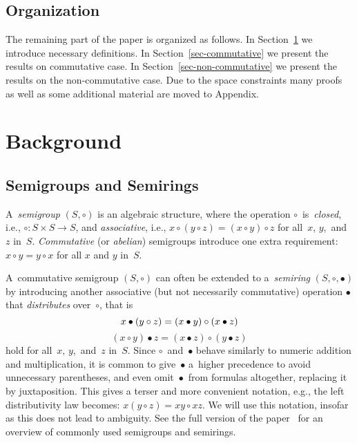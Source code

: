 \documentclass[a4paper,UKenglish,cleveref, autoref]{lipics-v2019}
\begin{document}
\subsection{Organization}

The remaining part of the paper is organized as follows. In Section~\ref{sec:background} we introduce necessary definitions. In Section~\ref{sec-commutative} we present the results on commutative case. In Section~\ref{sec-non-commutative} we present the results on the non-commutative case. Due to the space constraints many proofs as well as some additional material are moved to Appendix.

\section{Background} \label{sec:background}
\subsection{Semigroups and Semirings}
A~\emph{semigroup} $(S, \circ)$ is an algebraic structure, where
the operation
$\circ$~is~\emph{closed}, i.e., $\circ : S\times S \rightarrow S$,
and
\emph{associative}, i.e.,
$x \circ (y \circ z) = (x \circ y) \circ z$ for all~$x$, $y$,~and~$z$
in~$S$.
\emph{Commutative} (or \emph{abelian}) semigroups introduce
one extra requirement: $x \circ y = y \circ x$ for all $x$ and $y$
in~$S$.

A~commutative semigroup $(S, \circ)$ can often be extended to
a~\emph{semiring} $(S, \circ, \bullet)$ by introducing
another associative (but not necessarily
commutative)
operation $\bullet$ that \emph{distributes} over~$\circ$, that is
\[
x \bullet (y \circ z) = (x \bullet y) \circ (x \bullet z)\\
\]
\[
(x \circ y) \bullet z = (x \bullet z) \circ (y \bullet z)
\]
hold for all~$x$, $y$,~and~$z$ in~$S$.
Since $\circ$~and~$\bullet$ behave
similarly to numeric addition and multiplication, it is common to
give~$\bullet$ a~higher precedence to avoid
unnecessary parentheses, and even omit~$\bullet$~from
formulas altogether, replacing it by juxtaposition.
This gives a terser and
more convenient notation, e.g., the left distributivity law becomes:
$x (y \circ z) = x y \circ x z$. We will use this notation,
insofar as this does not lead to ambiguity. See 
the full version of the paper~\cite{DBLP:journals/eccc/KulikovMMP19}
for an overview of commonly used
semigroups and semirings.
\end{document}
